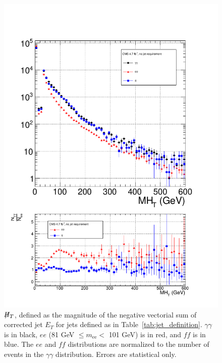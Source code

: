 \documentclass[dissertation.tex]{subfiles}
\begin{document}
\begin{figure}
	\centering
	\includegraphics[scale=0.5]{hadronic_activity_MHT}
	\caption{$\not\!\! H_{T}$, defined as the magnitude of the negative vectorial sum of corrected jet $E_{T}$ for jets defined as in Table~\ref{tab:jet_definition}.  $\gamma\gamma$ is in black, $ee$ (81 GeV $\leq m_{\mathrm{ee}} <$ 101 GeV) is in red, and $\mathit{ff}$ is in blue.  The $ee$ and $\mathit{ff}$ distributions are normalized to the number of events in the $\gamma\gamma$ distribution.  Errors are statistical only.}
	\label{fig:hadronic_activity_MHT}
\end{figure}
\end{document}
